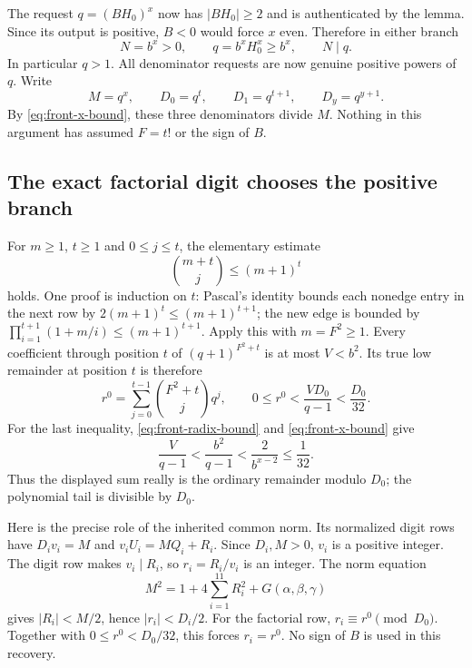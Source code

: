 The request $q=(BH_0)^x$ now has $|BH_0|\geq2$ and is authenticated
by the lemma.  Since its output is positive, $B<0$ would force $x$ even.
Therefore in either branch
\begin{equation}
 N=b^x>0,\qquad q=b^xH_0^x\geq b^x,\qquad N\mid q.
 \label{eq:front-radix-bound}
\end{equation}
In particular $q>1$.  All denominator requests are now genuine positive
powers of $q$.  Write
\[
 M=q^x,\qquad D_0=q^t,\qquad D_1=q^{t+1},\qquad D_y=q^{y+1}.
\]
By \eqref{eq:front-x-bound}, these three denominators divide $M$.
Nothing in this argument has assumed $F=t!$ or the sign of $B$.

\subsection{The exact factorial digit chooses the positive branch}

For $m\geq1$, $t\geq1$ and $0\leq j\leq t$, the elementary estimate
\begin{equation}
 \binom{m+t}{j}\leq(m+1)^t
 \label{eq:front-binomial-bound}
\end{equation}
holds.  One proof is induction on $t$: Pascal's identity bounds each
nonedge entry in the next row by $2(m+1)^t\leq(m+1)^{t+1}$; the new
edge is bounded by
$\prod_{i=1}^{t+1}(1+m/i)\leq(m+1)^{t+1}$.
Apply this with $m=F^2\geq1$.  Every coefficient through position $t$
of $(q+1)^{F^2+t}$ is at most $V<b^2$.  Its true low remainder at
position $t$ is therefore
\[
 r^0=\sum_{j=0}^{t-1}\binom{F^2+t}{j}q^j,
 \qquad
 0\leq r^0<\frac{V D_0}{q-1}<\frac{D_0}{32}.
\]
For the last inequality, \eqref{eq:front-radix-bound} and
\eqref{eq:front-x-bound} give
\[
 \frac{V}{q-1}<\frac{b^2}{q-1}
 <\frac{2}{b^{x-2}}\leq\frac1{32}.
\]
Thus the displayed sum really is the ordinary remainder modulo $D_0$;
the polynomial tail is divisible by $D_0$.

Here is the precise role of the inherited common norm.  Its normalized
digit rows have $D_i v_i=M$ and
$v_iU_i=M Q_i+R_i$.  Since $D_i,M>0$, $v_i$ is a positive integer.
The digit row makes $v_i\mid R_i$, so $r_i=R_i/v_i$ is an integer.
The norm equation
\begin{equation}
 M^2=1+4\sum_{i=1}^{11}R_i^2+G(\alpha,\beta,\gamma)
 \label{eq:front-norm}
\end{equation}
gives $|R_i|<M/2$, hence $|r_i|<D_i/2$.
For the factorial row, $r_i\equiv r^0\pmod{D_0}$.
Together with $0\leq r^0<D_0/32$, this forces $r_i=r^0$.
No sign of $B$ is used in this recovery.

